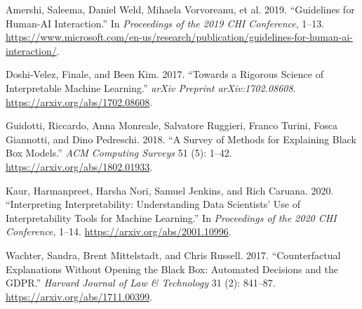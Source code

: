 \documentclass[
  letterpaper,
  DIV=11,
  numbers=noendperiod]{scrartcl}
\newlength{\cslhangindent}
\newenvironment{CSLReferences}[2] %
 {\begin{list}{}{%
  \setlength{\itemindent}{0pt}
  \setlength{\leftmargin}{0pt}
  \setlength{\parsep}{0pt}
  \ifodd #1
   \setlength{\leftmargin}{\cslhangindent}
   \setlength{\itemindent}{-1\cslhangindent}
  \fi
  \setlength{\itemsep}{#2\baselineskip}}}
 {\end{list}}
\begin{document}
\label{refs}
\begin{CSLReferences}{1}{0}
Amershi, Saleema, Daniel Weld, Mihaela Vorvoreanu, et al. 2019.
{``Guidelines for Human-AI Interaction.''} In \emph{Proceedings of the
2019 CHI Conference}, 1--13.
\url{https://www.microsoft.com/en-us/research/publication/guidelines-for-human-ai-interaction/}.

Doshi-Velez, Finale, and Been Kim. 2017. {``Towards a Rigorous Science
of Interpretable Machine Learning.''} \emph{arXiv Preprint
arXiv:1702.08608}. \url{https://arxiv.org/abs/1702.08608}.

Guidotti, Riccardo, Anna Monreale, Salvatore Ruggieri, Franco Turini,
Fosca Giannotti, and Dino Pedreschi. 2018. {``A Survey of Methods for
Explaining Black Box Models.''} \emph{ACM Computing Surveys} 51 (5):
1--42. \url{https://arxiv.org/abs/1802.01933}.

Kaur, Harmanpreet, Harsha Nori, Samuel Jenkins, and Rich Caruana. 2020.
{``Interpreting Interpretability: Understanding Data Scientists' Use of
Interpretability Tools for Machine Learning.''} In \emph{Proceedings of
the 2020 CHI Conference}, 1--14. \url{https://arxiv.org/abs/2001.10996}.

Wachter, Sandra, Brent Mittelstadt, and Chris Russell. 2017.
{``Counterfactual Explanations Without Opening the Black Box: Automated
Decisions and the GDPR.''} \emph{Harvard Journal of Law \& Technology}
31 (2): 841--87. \url{https://arxiv.org/abs/1711.00399}.

\end{CSLReferences}
\end{document}
